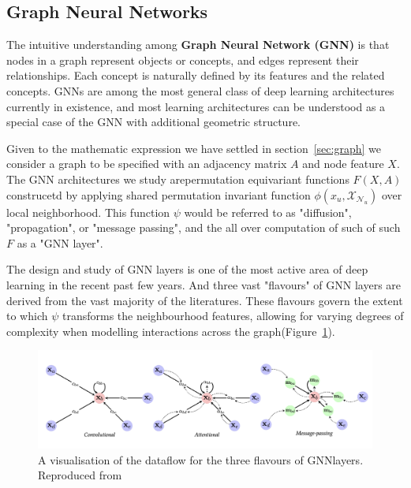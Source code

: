     \subsection{Graph Neural Networks}
    The intuitive understanding among \textbf{Graph Neural Network (GNN)} is that nodes in a graph represent objects or concepts, and edges represent their relationships. Each concept is naturally defined by its features and the related concepts\cite{10.1109/tnn.2008.2005605}. GNNs are among the most general class of deep learning architectures currently in existence, and most learning architectures can be understood as a special case of the GNN with additional geometric structure. 
    
    Given to the mathematic expression we have settled in section~\ref{sec:graph} we consider a graph to be specified with an adjacency matrix $A$ and node feature $X$. The GNN architectures we study arepermutation equivariant functions $F(X,A)$  construcetd by applying shared permutation invariant function $\phi(x_u,\mathcal{X}_{\mathcal{N}_u}) $ over local neighborhood. This function $\psi$ would be referred to as "diffusion", "propagation", or "message passing", and the all over computation of such of such $F$ as a "GNN layer".

    The design and study of GNN layers is one of the most active area of deep learning in the recent past few years. And three vast "flavours" of GNN layers are derived from the vast majority of the literatures. These flavours govern the extent to which $\psi$ transforms the neighbourhood features, allowing for varying degrees of complexity when modelling interactions across the graph(Figure~\ref{fig:graphlayer}). 
    
    \begin{figure}[h]
        \centering
        \includegraphics[width=\textwidth]{figures/02_GNNlayers.png}
        \caption{A visualisation of the dataflow for the three flavours of GNNlayers. Reproduced from \cite{10.48550/arxiv.2104.13478}}
        \label{fig:graphlayer}
    \end{figure}

